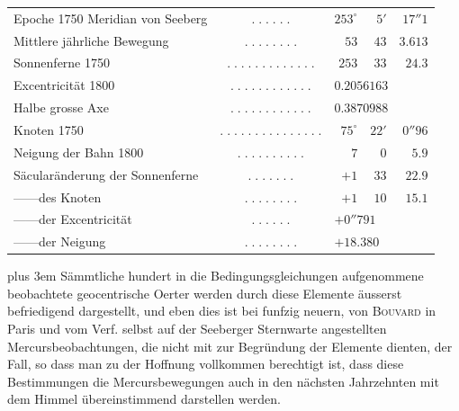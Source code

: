 \begin{center}\fontsize{9}{11}\selectfont\setlength{\tabcolsep}{2pt}\renewcommand{\arraystretch}{1.18}\begin{tabular}{@{}l c r@{\;}r@{\;}r@{}}
Epoche 1750 Meridian von Seeberg & $.\;.\;.\;.\;.\;.$ & $253^\circ$ & $5'$ & $17''1$\\
Mittlere jährliche Bewegung & $.\;.\;.\;.\;.\;.\;.\;.$ & $53$ & $43$ & $3.613$\\
Sonnenferne 1750 & $.\;.\;.\;.\;.\;.\;.\;.\;.\;.\;.\;.\;.$ & $253$ & $33$ & $24.3$\\
Excentricität 1800 & $.\;.\;.\;.\;.\;.\;.\;.\;.\;.\;.\;.$ & \multicolumn{3}{l}{$0.2056163$}\\
Halbe grosse Axe & $.\;.\;.\;.\;.\;.\;.\;.\;.\;.\;.\;.$ & \multicolumn{3}{l}{$0.3870988$}\\
Knoten 1750 & $.\;.\;.\;.\;.\;.\;.\;.\;.\;.\;.\;.\;.\;.\;.$ & $75^\circ$ & $22'$ & $0''96$\\
Neigung der Bahn 1800 & $.\;.\;.\;.\;.\;.\;.\;.\;.\;.$ & $7$ & $0$ & $5.9$\\
Säcularänderung der Sonnenferne & $.\;.\;.\;.\;.\;.\;.$ & $+1$ & $33$ & $22.9$\\
\quad —\quad —\quad des Knoten & $.\;.\;.\;.\;.\;.\;.\;.$ & $+1$ & $10$ & $15.1$\\
\quad —\quad —\quad der Excentricität & $.\;.\;.\;.\;.\;.$ & \multicolumn{3}{l}{$+0''791$}\\
\quad —\quad —\quad der Neigung & $.\;.\;.\;.\;.\;.\;.\;.$ & \multicolumn{3}{l}{$+18.380$}\\
\end{tabular}\end{center}

{\rightskip=0pt plus 3em Sämmtliche hundert in die Bedingungsgleichungen aufgenommene beobachtete geocentrische Oerter werden durch diese Elemente äusserst befriedigend dargestellt, und eben dies ist bei funfzig neuern, von \textsc{Bouvard} in Paris und vom Verf. selbst auf der Seeberger Sternwarte angestellten Mercursbeobachtungen, die nicht mit zur Begründung der Elemente dienten, der Fall, so dass man zu der Hoffnung vollkommen berechtigt ist, dass diese Bestimmungen die Mercursbewegungen auch in den nächsten Jahrzehnten mit dem Himmel übereinstimmend darstellen werden.\par}
